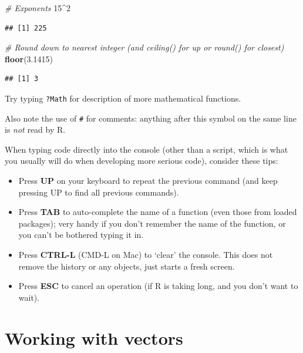 \documentclass[]{book}
\newenvironment{Shaded}{\begin{snugshade}}{\end{snugshade}}
\newcommand{\CommentTok}[1]{\textcolor[rgb]{0.56,0.35,0.01}{\textit{#1}}}
\newcommand{\DecValTok}[1]{\textcolor[rgb]{0.00,0.00,0.81}{#1}}
\newcommand{\FloatTok}[1]{\textcolor[rgb]{0.00,0.00,0.81}{#1}}
\newcommand{\KeywordTok}[1]{\textcolor[rgb]{0.13,0.29,0.53}{\textbf{#1}}}
\newcommand{\NormalTok}[1]{#1}
\newcommand{\OperatorTok}[1]{\textcolor[rgb]{0.81,0.36,0.00}{\textbf{#1}}}
\providecommand{\tightlist}{%
  \setlength{\itemsep}{0pt}\setlength{\parskip}{0pt}}
\let\BeginKnitrBlock\begin \let\EndKnitrBlock\end
\begin{document}
\begin{Shaded}
\begin{Highlighting}[]
\CommentTok{# Exponents}
\DecValTok{15}\OperatorTok{^}\DecValTok{2}
\end{Highlighting}
\end{Shaded}

\begin{verbatim}
## [1] 225
\end{verbatim}

\begin{Shaded}
\begin{Highlighting}[]
\CommentTok{# Round down to nearest integer (and ceiling() for up or round() for closest)}
\KeywordTok{floor}\NormalTok{(}\FloatTok{3.1415}\NormalTok{)}
\end{Highlighting}
\end{Shaded}

\begin{verbatim}
## [1] 3
\end{verbatim}

Try typing \texttt{?Math} for description of more mathematical functions.

Also note the use of \texttt{\#} for comments: anything after this symbol on the same line is \emph{not} read by R.

\BeginKnitrBlock{rmdtry}
When typing code directly into the console (other than a script, which is what you usually will do when developing more serious code), consider these tips:

\begin{itemize}
\tightlist
\item
  Press \textbf{UP} on your keyboard to repeat the previous command (and keep pressing UP to find all previous commands).
\item
  Press \textbf{TAB} to auto-complete the name of a function (even those from loaded packages); very handy if you don't remember the name of the function, or you can't be bothered typing it in.
\item
  Press \textbf{CTRL-L} (CMD-L on Mac) to `clear' the console. This does not remove the history or any objects, just starts a fresh screen.
\item
  Press \textbf{ESC} to cancel an operation (if R is taking long, and you don't want to wait).
\end{itemize}
\EndKnitrBlock{rmdtry}

\hypertarget{vectorintro}{%
\section{Working with vectors}\label{vectorintro}}
\end{document}
